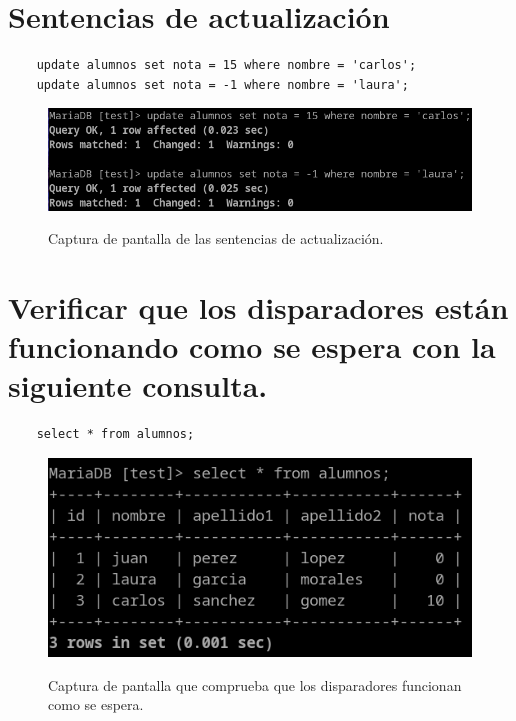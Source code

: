 \documentclass{article}
\begin{document}
\newpage %

\section*{Sentencias de actualización}
\begin{lstlisting}
    update alumnos set nota = 15 where nombre = 'carlos';
    update alumnos set nota = -1 where nombre = 'laura';
\end{lstlisting}
\begin{figure}[ht]
    \centering
    {
        \includegraphics[width=\linewidth]{05screenshot.png} %
    }
    \caption{Captura de pantalla de las sentencias de actualización.}
\end{figure}

\section{Verificar que los disparadores están funcionando como se espera con la siguiente consulta.}
\begin{lstlisting}
    select * from alumnos;
\end{lstlisting}

\begin{figure}[ht]
    \centering
    {
        \includegraphics[width=\linewidth]{06screenshot.png} %
    }
    \caption{Captura de pantalla que comprueba que los disparadores funcionan como se espera.}
\end{figure}
\newpage %
\end{document}
